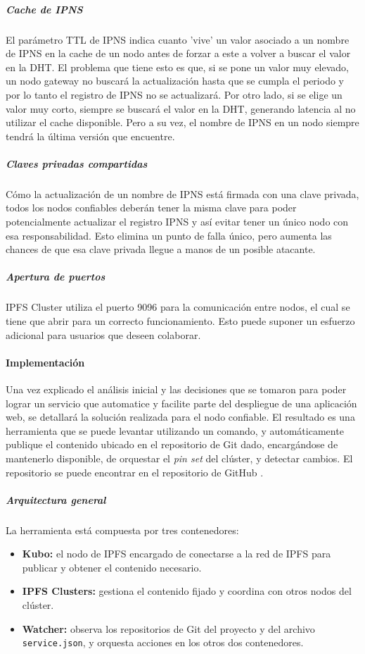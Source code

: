 \subparagraph{Cache de IPNS} El parámetro TTL de IPNS indica cuanto 'vive' un valor asociado a un nombre de IPNS en la cache de un nodo antes de forzar a este a volver a buscar el valor en la DHT. El problema que tiene esto es que, si se pone un valor muy elevado, un nodo gateway no buscará la actualización hasta que se cumpla el periodo y por lo tanto el registro de IPNS no se actualizará. Por otro lado, si se elige un valor muy corto, siempre se buscará el valor en la DHT, generando latencia al no utilizar el cache disponible. Pero a su vez, el nombre de IPNS en un nodo siempre tendrá la última versión que encuentre.

\subparagraph{Claves privadas compartidas} Cómo la actualización de un nombre de IPNS está firmada con una clave privada, todos los nodos confiables deberán tener la misma clave para poder potencialmente actualizar el registro IPNS y así evitar tener un único nodo con esa responsabilidad. Esto elimina un punto de falla único, pero aumenta las chances de que esa clave privada llegue a manos de un posible atacante.

\subparagraph{Apertura de puertos} IPFS Cluster utiliza el puerto 9096 para la comunicación entre nodos, el cual se tiene que abrir para un correcto funcionamiento. Esto puede suponer un esfuerzo adicional para usuarios que deseen colaborar.

\paragraph{Implementación}

Una vez explicado el análisis inicial y las decisiones que se tomaron para poder lograr un servicio que automatice y facilite parte del despliegue de una aplicación web, se detallará la solución realizada para el nodo confiable. El resultado es una herramienta que se puede levantar utilizando un comando, y automáticamente publique el contenido ubicado en el repositorio de Git dado, encargándose de mantenerlo disponible, de orquestar el \textit{pin set} del clúster, y detectar cambios. El repositorio se puede encontrar en el repositorio de GitHub \cite{repo-trusted-peer}.

\subparagraph{Arquitectura general}

La herramienta está compuesta por tres contenedores:
\begin{itemize}
    \item \textbf{Kubo:} el nodo de IPFS encargado de conectarse a la red de IPFS para publicar y obtener el contenido necesario.
    \item \textbf{IPFS Clusters:} gestiona el contenido fijado y coordina con otros nodos del clúster.
    \item \textbf{Watcher:} observa los repositorios de Git del proyecto y del archivo \texttt{service.json}, y orquesta acciones en los otros dos contenedores.
\end{itemize}

